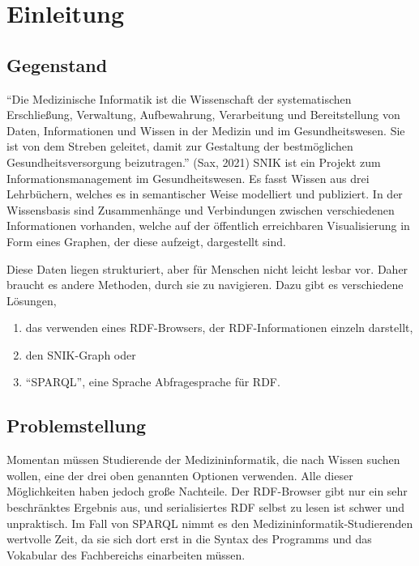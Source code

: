 \chapter{Einleitung}\label{ch:introduction}

\section{Gegenstand}
\enquote{Die Medizinische Informatik ist die Wissenschaft der systematischen Erschließung, Verwaltung, Aufbewahrung, Verarbeitung und Bereitstellung von Daten, Informationen und Wissen in der Medizin und im Gesundheitswesen. Sie ist von dem Streben geleitet, damit zur Gestaltung der bestmöglichen Gesundheitsversorgung beizutragen.} (Sax, 2021)
SNIK ist ein Projekt zum Informationsmanagement im Gesundheitswesen.
Es fasst Wissen aus drei Lehrbüchern, welches es in semantischer Weise modelliert und publiziert.
In der Wissensbasis sind Zusammenhänge und Verbindungen zwischen verschiedenen Informationen vorhanden, welche auf der öffentlich erreichbaren Visualisierung in Form eines Graphen, der diese aufzeigt, dargestellt sind.

Diese Daten liegen strukturiert, aber für Menschen nicht leicht lesbar vor. Daher braucht es andere Methoden, durch sie zu navigieren.
Dazu gibt es verschiedene Lösungen,
\begin{enumerate}
\item das verwenden eines RDF-Browsers, der RDF-Informationen einzeln darstellt,
\item den SNIK-Graph oder
\item \enquote{SPARQL}, eine Sprache Abfragesprache für RDF.
\end{enumerate}

\section{Problemstellung}

Momentan müssen Studierende der Medizininformatik, die nach Wissen suchen wollen, eine der drei oben genannten Optionen verwenden.
Alle dieser Möglichkeiten haben jedoch große Nachteile.
Der RDF-Browser gibt nur ein sehr beschränktes Ergebnis aus, und serialisiertes RDF selbst zu lesen ist schwer und unpraktisch.
Im Fall von SPARQL nimmt es den Medizininformatik-Studierenden wertvolle Zeit, da sie sich dort erst in die Syntax des Programms und das Vokabular des Fachbereichs einarbeiten müssen.

